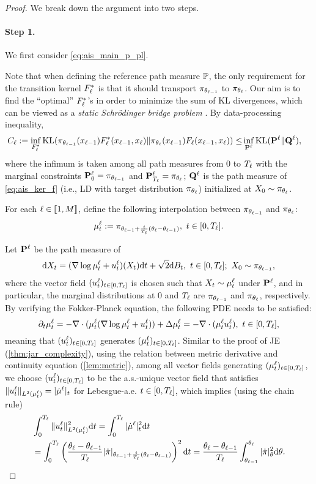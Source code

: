 \begin{proof}
    We break down the argument into two steps.
    
    \paragraph{Step 1.} We first consider \cref{eq:ais_main_p_pl}. 

    Note that when defining the reference path measure $\P$, the only requirement for the transition kernel $F_\l^*$ is that it should transport $\pi_{\theta_{\l-1}}$ to $\pi_{\theta_\l}$. Our aim is to find the ``optimal'' $F_\l^*$'s in order to minimize the sum of KL divergences, which can be viewed as a \emph{static Schr\"odinger bridge problem} \citep{leonard2014a,chen2016relation,chen2021stochastic}. By data-processing inequality,
    \begin{align*}
        C_\l:=\inf_{F_\l^*}\kl(\pi_{\theta_{\l-1}}(x_{\l-1})F^*_\l(x_{\l-1},x_\l)\|\pi_{\theta_\l}(x_{\l-1})F_\l(x_{\l-1},x_\l))\le & \inf_{\Pbf^\l}\kl(\Pbf^\l\|\Qbf^\l),
    \end{align*}
    where the infimum is taken among all path measures from $0$ to $T_\l$ with the marginal constraints $\Pbf^\l_0=\pi_{\theta_{\l-1}}$ and $\Pbf^\l_{T_\l}=\pi_{\theta_\l}$; $\Qbf^\l$ is the path measure of \cref{eq:ais_ker_f} (i.e., LD with target distribution $\pi_{\theta_\l}$) initialized at $X_0\sim\pi_{\theta_\l}$.

    For each $\l\in\sqd{1,M}$, define the following interpolation between $\pi_{\theta_{\l-1}}$ and $\pi_{\theta_\l}$:
    $$\mu^\l_t:=\pi_{\theta_{\l-1}+\frac{t}{T_\l}(\theta_\l-\theta_{\l-1})},~t\in[0,T_\l].$$

    Let $\Pbf^\l$ be the path measure of
    $$\d X_t=(\nabla\log\mu^\l_t+u^\l_t)(X_t)\d t+\sqrt{2}\d B_t,~t\in[0,T_\l];~X_0\sim\pi_{\theta_{\l-1}},$$
    where the vector field $(u^\l_t)_{t\in[0,T_\l]}$ is chosen such that $X_t\sim\mu^\l_t$ under $\Pbf^\l$, and in particular, the marginal distributions at $0$ and $T_\l$ are $\pi_{\theta_{\l-1}}$ and $\pi_{\theta_\l}$, respectively. By verifying the Fokker-Planck equation, the following PDE needs to be satisfied:
    $$\partial_t\mu^\l_t=-\nabla\cdot(\mu^\l_t(\nabla\log\mu^\l_t+u^\l_t))+\Delta\mu^\l_t=-\nabla\cdot(\mu^\l_tu^\l_t),~t\in[0,T_\l],$$
    meaning that $(u^\l_t)_{t\in[0,T_\l]}$ generates $(\mu^\l_t)_{t\in[0,T_\l]}$. Similar to the proof of JE (\cref{thm:jar_complexity}), using the relation between metric derivative and continuity equation (\cref{lem:metric}), among all vector fields generating $(\mu^\l_t)_{t\in[0,T_\l]}$, we choose $(u^\l_t)_{t\in[0,T_\l]}$ to be the a.s.-unique vector field that satisfies $\|u^\l_t\|_{L^2(\mu^\l_t)}=|\dot\mu^\l|_t$ for Lebesgue-a.e. $t\in[0,T_\l]$, which implies (using the chain rule)
    \begin{align*}
        &\int_0^{T_\l}\|u^\l_t\|_{L^2(\mu^\l_t)}^2\d t=\int_0^{T_\l}|\dot\mu^\l|_t^2\d t\\
        &=\int_0^{T_\l}\ro{\frac{\theta_\l-\theta_{\l-1}}{T_\l}|\dot\pi|_{\theta_{\l-1}+\frac{t}{T_\l}(\theta_\l-\theta_{\l-1})}}^2\d t=\frac{\theta_\l-\theta_{\l-1}}{T_\l}\int_{\theta_{\l-1}}^{\theta_\l}|\dot\pi|_\theta^2\d\theta.
    \end{align*}


\end{proof}
